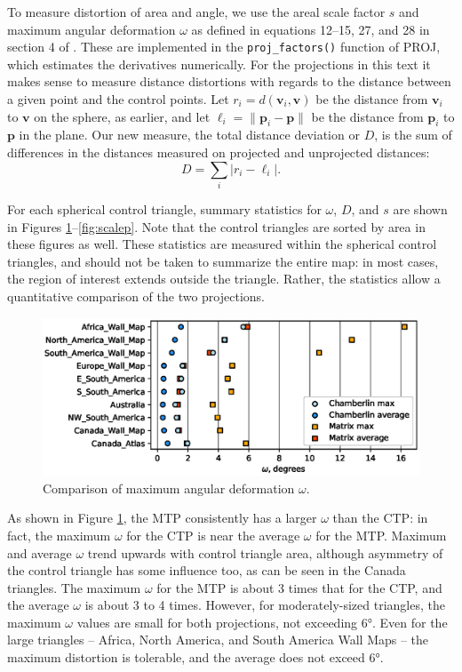 \documentclass[]{interact}
\begin{document}
To measure distortion of area and angle, we use the areal scale factor $s$ and
maximum angular deformation $\omega$ as defined in equations 12--15, 27, and 28
in section 4 of \citet{snyder87}. These are implemented in the
\verb|proj_factors()| function of PROJ, which estimates the derivatives
numerically. For the projections in this text it makes sense to measure distance
distortions with regards to the distance between a given point and the control
points. Let $r_i = d(\mathbf v_i, \mathbf v)$ be the distance from
$\mathbf v_i$ to $\mathbf v$ on the sphere, as earlier, and let
$\ell_i = \|\mathbf p_i - \mathbf p\|$ be the distance from $\mathbf p_i$ to
$\mathbf p$ in the plane.
Our new measure, the total distance deviation or $D$, is the sum of
differences in the distances measured on projected and unprojected distances:
\begin{equation}
 D = \sum_i \left| r_i - \ell_i \right|.
\end{equation}

For each spherical control triangle, summary statistics for $\omega$, $D$, and
$s$ are shown in Figures \ref{fig:omegap}--\ref{fig:scalep}. Note that the
control triangles are sorted by area in these figures as well.
These statistics are measured within the spherical control triangles,
and should not be taken to summarize the entire map: in most cases,
the region of interest extends outside the triangle.
Rather, the statistics allow a quantitative comparison of the two projections.

\begin{figure}
  \includegraphics[width=\textwidth]{omegaplot}
  \caption{Comparison of maximum angular deformation $\omega$.}
  \label{fig:omegap}
\end{figure}

As shown in Figure \ref{fig:omegap}, the MTP consistently has a larger $\omega$
than the CTP: in fact, the maximum $\omega$ for the CTP is near the average
$\omega$ for the MTP. Maximum and average $\omega$ trend upwards with control
triangle area, although asymmetry of the control triangle has some influence
too, as can be seen in the Canada triangles. The maximum $\omega$ for the MTP
is about 3 times that for the CTP, and the average $\omega$ is about 3 to 4
times. However, for moderately-sized triangles,
the maximum $\omega$ values are small for both projections, not exceeding 6°.
Even for the large triangles -- Africa, North America, and South America Wall
Maps -- the maximum distortion is tolerable, and the average does not exceed 6°.
\end{document}
